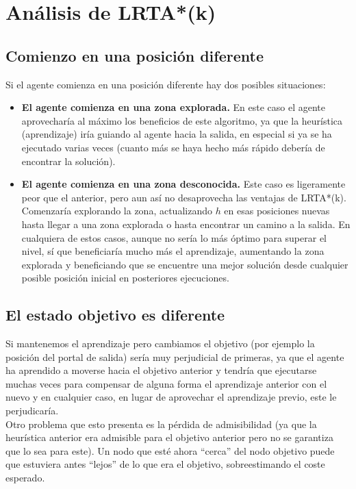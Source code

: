 \documentclass[11pt]{article}
\begin{document}
\section{Análisis de LRTA*(k)}

\subsection{Comienzo en una posición diferente}
Si el agente comienza en una posición diferente hay dos posibles situaciones:
\begin{itemize}
    \item \textbf{El agente comienza en una zona explorada.} En este caso el agente aprovecharía al máximo los beneficios de este algoritmo, ya que la heurística (aprendizaje) iría guiando al agente hacia la salida, en especial si ya se ha ejecutado varias veces (cuanto más se haya hecho más rápido debería de encontrar la solución). 
    \item \textbf{El agente comienza en una zona desconocida.} Este caso es ligeramente peor que el anterior, pero aun así no desaprovecha las ventajas de LRTA*(k). Comenzaría explorando la zona, actualizando $h$ en esas posiciones nuevas hasta llegar a una zona explorada o hasta encontrar un camino a la salida. En cualquiera de estos casos, aunque no sería lo más óptimo para superar el nivel, sí que beneficiaría mucho más el aprendizaje, aumentando la zona explorada y beneficiando que se encuentre una mejor solución desde cualquier posible posición inicial en posteriores ejecuciones. 
\end{itemize}

\subsection{El estado objetivo es diferente}
Si mantenemos el aprendizaje pero cambiamos el objetivo (por ejemplo la posición del portal de salida) sería muy perjudicial de primeras, ya que el agente ha aprendido a moverse hacia el objetivo anterior y tendría que ejecutarse muchas veces para compensar de alguna forma el aprendizaje anterior con el nuevo y en cualquier caso, en lugar de aprovechar el aprendizaje previo, este le perjudicaría.\\

Otro problema que esto presenta es la pérdida de admisibilidad (ya que la heurística anterior era admisible para el objetivo anterior pero no se garantiza que lo sea para este). Un nodo que esté ahora ``cerca'' del nodo objetivo puede que estuviera antes ``lejos'' de lo que era el objetivo, sobreestimando el coste esperado.\\
\end{document}
